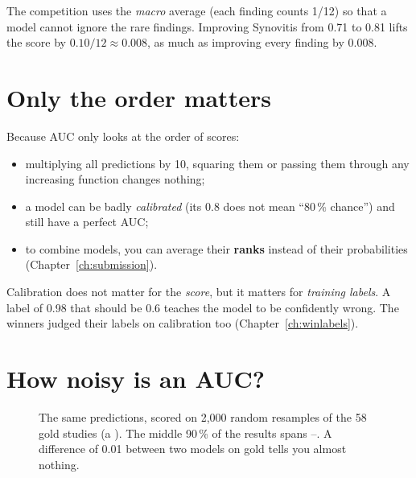 \begin{why}
The competition uses the \emph{macro} average (each finding counts 1/12) so that a model cannot ignore the rare
findings. Improving Synovitis from 0.71 to 0.81 lifts the score by $0.10/12 \approx 0.008$, as much as improving every
finding by 0.008.
\end{why}

\section{Only the order matters}

Because AUC only looks at the order of scores:
\begin{itemize}
\item multiplying all predictions by 10, squaring them or passing them through any increasing function changes
      nothing;
\item a model can be badly \emph{calibrated} (its 0.8 does not mean ``80\,\% chance'') and still have a perfect AUC;
\item to combine models, you can average their \textbf{ranks} instead of their probabilities (Chapter~\ref{ch:submission}).
\end{itemize}

\begin{watchout}
Calibration does not matter for the \emph{score}, but it matters for \emph{training labels}. A label of 0.98 that
should be 0.6 teaches the model to be confidently wrong. The winners judged their labels on calibration too
(Chapter~\ref{ch:winlabels}).
\end{watchout}

\section{How noisy is an AUC?}

\begin{figure}[H]
\centering
{}
\caption{The same predictions, scored on 2,000 random resamples of the 58 gold studies (a ). The
middle 90\,\% of the results spans \bootLo--\bootHi. A difference of 0.01 between two models on gold tells you almost
nothing.}
\label{fig:bootstrap}
\end{figure}

